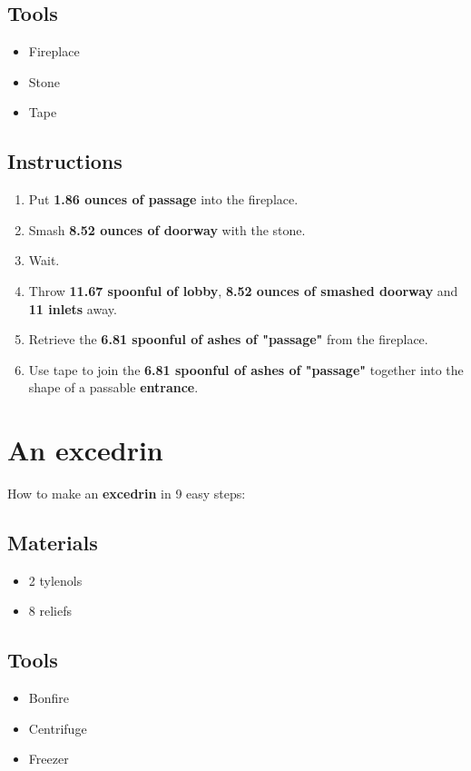 \documentclass{article}
\begin{document}
\subsection{Tools}\begin{itemize}
\item 
Fireplace
\item 
Stone
\item 
Tape
\end{itemize}
\subsection{Instructions}\begin{enumerate}
\item 
Put \textbf{1.86 ounces of passage} into the fireplace.
\item 
Smash \textbf{8.52 ounces of doorway} with the stone.
\item 
Wait.
\item 
Throw \textbf{11.67 spoonful of lobby}, \textbf{8.52 ounces of smashed doorway} and \textbf{11 inlets} away.
\item 
Retrieve the \textbf{6.81 spoonful of ashes of "passage"} from the fireplace.
\item 
Use tape to join the \textbf{6.81 spoonful of ashes of "passage"} together into the shape of a passable \textbf{entrance}.
\end{enumerate}
\newpage
\section{An excedrin}How to make an \textbf{excedrin} in 9 easy steps:

\subsection{Materials}\begin{itemize}
\item 
2 tylenols
\item 
8 reliefs
\end{itemize}
\subsection{Tools}\begin{itemize}
\item 
Bonfire
\item 
Centrifuge
\item 
Freezer
\end{itemize}
\end{document}
